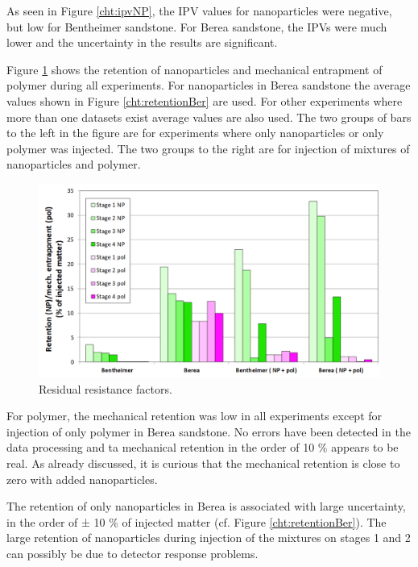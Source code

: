As seen in Figure \ref{cht:ipvNP}, the IPV values for nanoparticles were negative, but low for Bentheimer sandstone. For Berea sandstone, the IPVs were much lower and the uncertainty in the results are significant. 

Figure \ref{cht:retentionMech} shows the retention of nanoparticles and mechanical entrapment of polymer during all experiments. For nanoparticles in Berea sandstone the average values shown in Figure \ref{cht:retentionBer} are used. For other experiments where more than one datasets exist average values are also used. The two groups of bars to the left in the figure are for experiments where only nanoparticles or only polymer was injected. The two groups to the right are for injection of mixtures of nanoparticles and polymer.

\begin{figure}[h]
    \centering
    \includegraphics[width=\textwidth]{img/cht/retentionMech.png}
    \caption{Residual resistance factors.}
    \label{cht:retentionMech} %
\end{figure}

For polymer, the mechanical retention was low in all experiments except for injection of only polymer in Berea sandstone. No errors have been detected in the data processing and ta mechanical retention in the order of 10 \% appears to be real. As already discussed, it is curious that the mechanical retention is close to zero with added nanoparticles. 

The retention of only nanoparticles in Berea is associated with large uncertainty, in the order of ± 10 \% of injected matter (cf. Figure \ref{cht:retentionBer}). The large retention of nanoparticles during injection of the mixtures on stages 1 and 2 can possibly be due to detector response problems. 

